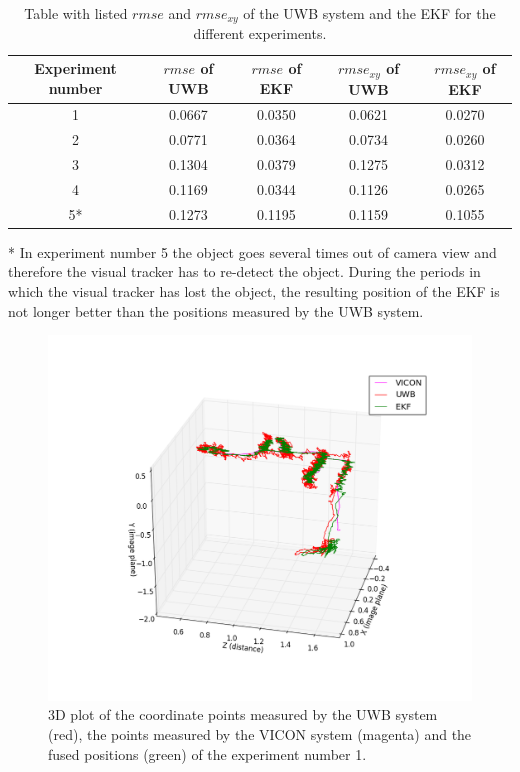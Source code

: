 \begin{table}[ht!]
\begin{center}
\begin{tabular}{c|c|c|c|c}
	Experiment number & $\textit{rmse}$ of \ac{UWB} & $\textit{rmse}$ of \ac{EKF} & $\textit{rmse}_{xy}$ of \ac{UWB} & $\textit{rmse}_{xy}$ of \ac{EKF}\\ 
	\hline 
	1 & 0.0667 & 0.0350 & 0.0621 & 0.0270 \\
	2 & 0.0771 & 0.0364 & 0.0734 & 0.0260 \\
	3 & 0.1304 & 0.0379 & 0.1275 & 0.0312 \\
	4 & 0.1169 & 0.0344 & 0.1126 & 0.0265 \\
	5* & 0.1273 & 0.1195 & 0.1159 & 0.1055
\end{tabular}
\end{center}
\caption{Table with listed $\textit{rmse}$ and $\textit{rmse}_{xy}$ of the \ac{UWB} system and the \ac{EKF} for the different experiments.}
\label{tab:results}
\end{table}

* In experiment number 5 the object goes several times out of camera view and therefore the visual tracker has to re-detect the object. During the periods in which the visual tracker has lost the object, the resulting position of the \ac{EKF} is not longer better than the positions measured by the \ac{UWB} system.

\begin{figure}[ht!]\centering
	\includegraphics[width=1.0\textwidth]{figures/evaluation}
	\caption{3D plot of the coordinate points measured by the \ac{UWB} system (red), the points measured by the VICON system (magenta) and the fused positions (green) of the experiment number 1.}\label{fig:evaluation}
\end{figure}

